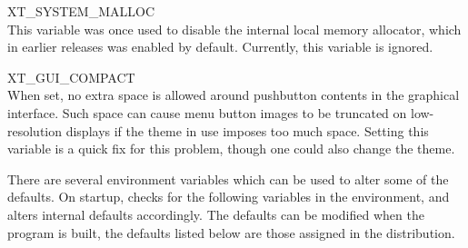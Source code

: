 \begin{description}
\item{\et XT\_SYSTEM\_MALLOC}\\
This variable was once used to disable the internal local memory
allocator, which in earlier releases was enabled by default. 
Currently, this variable is ignored.

\item{\et XT\_GUI\_COMPACT}\\
When set, no extra space is allowed around pushbutton contents in the
graphical interface.  Such space can cause menu button images to
be truncated on low-resolution displays if the theme in use imposes
too much space.  Setting this variable is a quick fix for this
problem, though one could also change the theme.
\end{description}

There are several environment variables which can be used to alter
some of the {\WRspice} defaults.  On startup, {\WRspice} checks for the
following variables in the environment, and alters internal defaults
accordingly.  The defaults can be modified when the program is built,
the defaults listed below are those assigned in the distribution.

